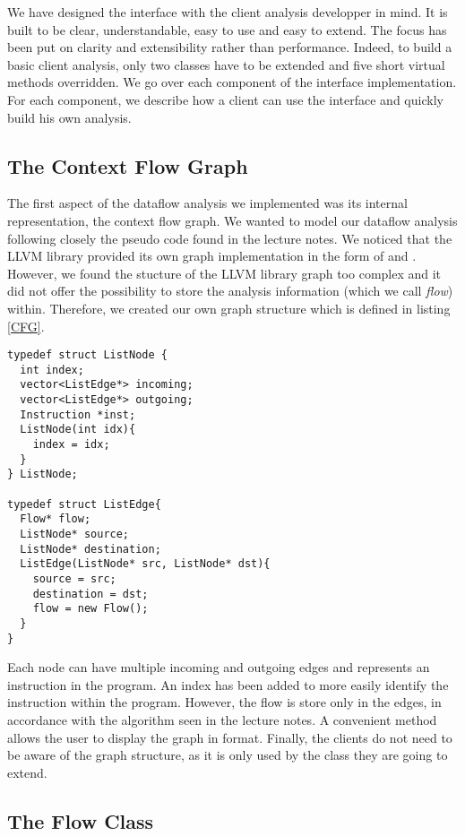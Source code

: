 We have designed the interface with the client analysis developper in mind.
It is built to be clear, understandable, easy to use and easy to extend. The focus has been put on clarity and extensibility rather than performance. Indeed, to build a basic client analysis, only two classes have to be extended and five short virtual methods overridden. We go over each component of the interface implementation. For each component, we describe how a client can use the interface and quickly build his own analysis.

\subsection{The Context Flow Graph}
The first aspect of the dataflow analysis we implemented was its internal representation, the context flow graph.
We wanted to model our dataflow analysis following closely the pseudo code found in the lecture notes. We noticed that the LLVM library provided its own graph implementation in the form of  and . However, we found the stucture of the LLVM library graph too complex and it did not offer the possibility to store the analysis information (which we call \emph{flow}) within. Therefore, we created our own graph structure which is defined in listing \ref{CFG}.

\begin{lstlisting}[caption=Context Flow Graph, label=CFG]
typedef struct ListNode {
  int index;
  vector<ListEdge*> incoming;
  vector<ListEdge*> outgoing;
  Instruction *inst;
  ListNode(int idx){
    index = idx;
  }
} ListNode;

typedef struct ListEdge{
  Flow* flow;
  ListNode* source;
  ListNode* destination;
  ListEdge(ListNode* src, ListNode* dst){
    source = src;
    destination = dst;
    flow = new Flow();
  }
} 
\end{lstlisting}

Each node can have multiple incoming and outgoing edges and represents an instruction in the program. An index has been added to more easily identify the instruction within the program. However, the flow is store only in the edges, in accordance with the algorithm seen in the lecture notes. A convenient method allows the user to display the graph in  format. Finally, the clients do not need to be aware of the graph structure, as it is only used by the class they are going to extend.

\subsection{The Flow Class}

